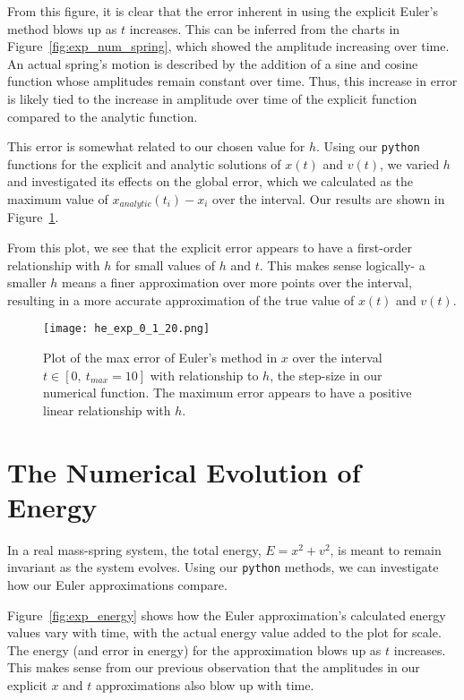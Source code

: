 \documentclass{article}
\begin{document}
From this figure, it is clear that the error inherent in using the explicit Euler's method blows up as $t$ increases.  This can be inferred from the charts in Figure~\ref{fig:exp_num_spring}, which showed the amplitude increasing over time.  An actual spring's motion is described by the addition of a sine and cosine function whose amplitudes remain constant over time.  Thus, this increase in error is likely tied to the increase in amplitude over time of the explicit function compared to the analytic function.

This error is somewhat related to our chosen value for $h$.  Using our \texttt{python} functions for the explicit and analytic solutions of $x(t)$ and $v(t)$, we varied $h$ and investigated its effects on the global error, which we calculated as the maximum value of $x_{analytic}(t_i) - x_i$ over the interval.  Our results are shown in Figure~\ref{fig:err_h}.

From this plot, we see that the explicit error appears to have a first-order relationship with $h$ for small values of $h$ and $t$.   This makes sense logically- a smaller $h$ means a finer approximation over more points over the interval, resulting in a more accurate approximation of the true value of $x(t)$ and $v(t)$. 

\begin{figure}
    \centering
    \texttt{[image: he\_exp\_0\_1\_20.png]}{}
    \caption{Plot of the max error of Euler's method in $x$ over the interval $t \in [0, ~t_{max} = 10]$ with relationship to $h$, the step-size in our numerical function.  The maximum error appears to have a positive linear relationship with $h$.}
    \label{fig:err_h}
\end{figure}


\section{The Numerical Evolution of Energy}

In a real mass-spring system, the total energy, $E = x^2 + v^2$, is meant to remain invariant as the system evolves.  Using our \texttt{python} methods, we can investigate how our Euler approximations compare.

Figure~\ref{fig:exp_energy} shows how the Euler approximation's calculated energy values vary with time, with the actual energy value added to the plot for scale.  The energy (and error in energy) for the approximation blows up as $t$ increases.  This makes sense from our previous observation that the amplitudes in our explicit $x$ and $t$ approximations also blow up with time.
\end{document}
